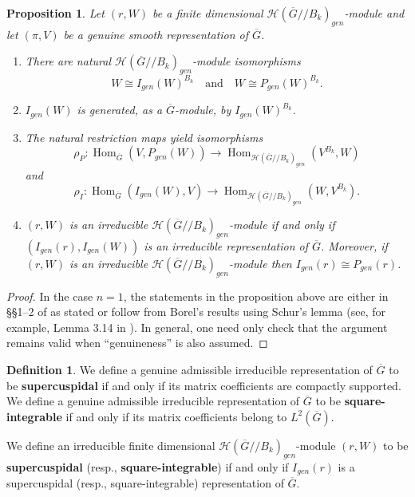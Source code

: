 \documentclass[12pt,letterpaper,reqno]{amsart}
\let\cal\mathcal
\newtheorem{proposition}[theorem]{Proposition}
\theoremstyle{definition}
\newtheorem{definition}[theorem]{Definition}
\theoremstyle{remark}
\numberwithin{equation}{section}
\begin{document}
\begin{proposition}
\label{prop:borel}
Let $(r,W)$ be a finite dimensional ${\cal H}(\overline{G}//B_k)_{gen}$-module
and let $(\pi,V)$ be a genuine smooth representation of $\overline{G}$.
\begin{enumerate}
\item[(a)] There are natural ${\cal H}(\overline{G}//B_k)_{gen}$-module
isomorphisms
\[
W\cong I_{gen}(W)^{B_k}\quad \text{and}\quad W\cong P_{gen}(W)^{B_k}.
\]
\item[(b)] $I_{gen}(W)$ is generated, as a $\overline{G}$-module, by
$I_{gen}(W)^{B_k}$.
\item[(c)] The natural restriction maps yield isomorphisms
\[
\rho_P : \operatorname{Hom}_{\overline{G}}(V,P_{gen}(W))
\longrightarrow
\operatorname{Hom}_{{\cal H}(\overline{G}//B_k)_{gen}}(V^{B_k},W)
\]
and
\[
\rho_I : \operatorname{Hom}_{\overline{G}}(I_{gen}(W),V)
\longrightarrow
\operatorname{Hom}_{{\cal H}(\overline{G}//B_k)_{gen}}(W,V^{B_k}).
\]
\item[(d)] $(r,W)$ is an irreducible ${\cal H}(\overline{G}//B_k)_{gen}$-module
if and only if $(I_{gen}(r),I_{gen}(W))$ is an irreducible representation of
$\overline{G}$. Moreover, if $(r,W)$ is an irreducible
${\cal H}(\overline{G}//B_k)_{gen}$-module then $I_{gen}(r)\cong P_{gen}(r)$.
\end{enumerate}
\end{proposition}

\begin{proof}
In the case $n=1$, the statements in the proposition above are either in
\S\S 1--2 of \cite{Bo76} as stated or follow from Borel's results using Schur's
lemma (see, for example, Lemma 3.14 in \cite{CR81}). In general, one need only
check that the argument remains valid when ``genuineness'' is also assumed.
\end{proof}

\begin{definition}
\label{def:17}
We define a genuine admissible irreducible representation of $\overline{G}$ to
be \textbf{supercuspidal} if and only if its matrix coefficients are compactly
supported. We define a genuine admissible irreducible representation of
$\overline{G}$ to be \textbf{square-integrable} if and only if its matrix
coefficients belong to $L^2(\overline{G})$.

We define an irreducible finite dimensional
${\cal H}(\overline{G}//B_k)_{gen}$-module $(r,W)$ to be \textbf{supercuspidal}
(resp., \textbf{square-integrable}) if and only if $I_{gen}(r)$ is a
supercuspidal (resp., square-integrable) representation of $\overline{G}$.
\end{definition}
\end{document}
